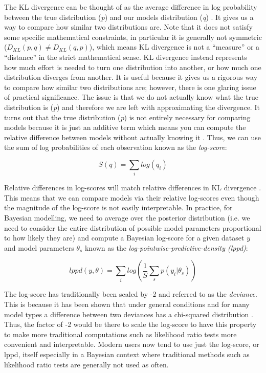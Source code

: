 The KL divergence can be thought of as the average difference in log probability between the true distribution (\textit{p}) and our models distribution (\textit{q}) \cite{McElreath2020}. It gives us a way to compare how similar two distributions are. Note that it does not satisfy some specific mathematical constraints, in particular it is generally not symmetric ($D_{KL}(p,q) \neq D_{KL}(q,p)$), which means KL divergence is not a ``measure'' or a ``distance'' in the strict mathematical sense. KL divergence instead represents how much effort is needed to turn one distribution into another, or how much one distribution diverges from another. It is useful because it gives us a rigorous way to compare how similar two distributions are; however, there is one glaring issue of practical significance. The issue is that we do not actually know what the true distribution is (\textit{p}) and therefore we are left with approximating the divergence. It turns out that the true distribution (\textit{p}) is not entirely necessary for comparing models because it is just an additive term which means you can compute the relative difference between models without actually knowing it \cite{McElreath2020}. Thus, we can use the sum of log probabilities of each observation known as the \textit{log-score}:

\begin{equation} \label{eq:log-score}
S(q) = \sum_i log(q_i)
\end{equation}

Relative differences in log-scores will match relative differences in KL divergence \cite{McElreath2020}. This means that we can compare models via their relative log-scores even though the magnitude of the log-score is not easily interpretable. In practice, for Bayesian modelling, we need to average over the posterior distribution (i.e. we need to consider the entire distribution of possible model parameters proportional to how likely they are) and compute a Bayesian log-score for a given dataset $y$ and model parameters $\theta_s$ known as the \textit{log-pointwise-predictive-density (lppd)}:

\begin{equation} \label{eq:lppd}
lppd(y, \theta) = \sum_i log \left( \frac{1}{S} \sum_s p(y_i | \theta_s) \right)
\end{equation}

The log-score has traditionally been scaled by -2 and referred to as the \textit{deviance}. This is because it has been shown that under general conditions and for many model types a difference between two deviances has a chi-squared distribution \cite{Dunn2018}. Thus, the factor of -2 would be there to scale the log-score to have this property to make more traditional computations such as likelihood ratio tests more convenient and interpretable. Modern users now tend to use just the log-score, or lppd, itself especially in a Bayesian context where traditional methods such as likelihood ratio tests are generally not used as often.

